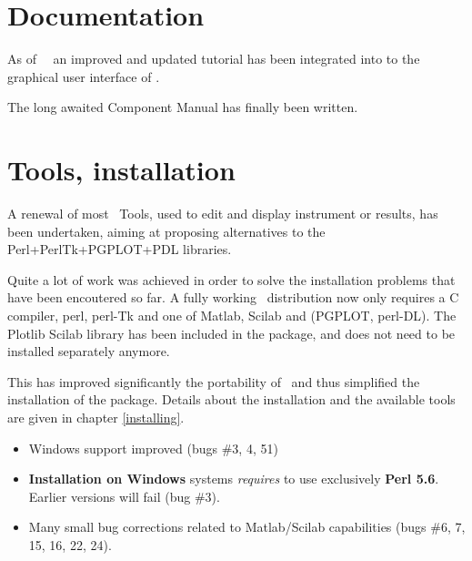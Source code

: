 \section{Documentation}
\label{s:new-features:documentation}
As of \MCS\ \version\ an improved and updated tutorial has been integrated
into to the graphical user interface of \MCS . 

The long awaited Component Manual has finally been written.

\section{Tools, installation}
\label{s:new-features:tools}
  A renewal of most \MCS\ Tools, used to edit and display instrument or
  results,  has been undertaken, aiming at proposing alternatives to the
  Perl+PerlTk+PGPLOT+PDL  libraries.

  Quite a lot of work was achieved in order to solve the installation problems
   that have been encoutered so far. A fully working \MCS\ distribution now
   only requires a C compiler, perl, perl-Tk and one of Matlab, Scilab and
   (PGPLOT, perl-DL). The Plotlib Scilab library has  been included in the
   package, and does not need to be installed separately anymore.

  This has improved significantly the portability of \MCS\ and thus simplified
  the installation of the package. Details about the installation and the
  available tools are given in chapter \ref{installing}.

\begin{itemize}
\item Windows support improved (bugs \#3, 4, 51)
\item {\bf Installation on Windows} systems \emph{requires} to use exclusively {\bf Perl 5.6}. Earlier versions will fail (bug \#3).
\item Many small bug corrections related to Matlab/Scilab capabilities (bugs \#6, 7, 15, 16, 22, 24).
\end{itemize}

